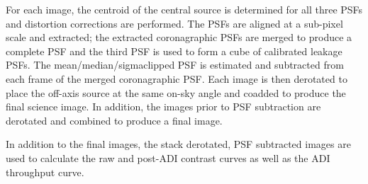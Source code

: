 For each image, the centroid of the central source is determined for all three PSFs and
distortion corrections are performed. The PSFs are aligned at a sub-pixel scale and extracted;
the extracted coronagraphic PSFs are merged to produce a complete PSF and the third PSF is used to form a cube of calibrated leakage PSFs.
The mean/median/sigmaclipped PSF is estimated and subtracted from each frame of the merged coronagraphic PSF. Each image is
then derotated to place the off-axis source at the same on-sky angle
and coadded to produce the final science image. In addition, the
images prior to PSF subtraction are derotated and combined to produce
a final image.

In addition to the final images, the stack derotated, PSF subtracted
images are used to calculate the raw and post-ADI contrast curves
as well as the ADI throughput curve.



